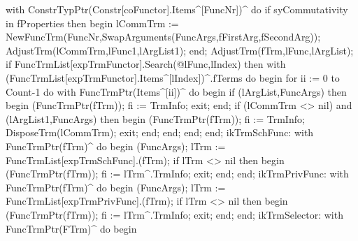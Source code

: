              with ConstrTypPtr(Constr[coFunctor].Items^[FuncNr])^ do
                 if syCommutativity in fProperties then
                 begin
                    lCommTrm := NewFuncTrm(FuncNr,SwapArguments(FuncArgs,fFirstArg,fSecondArg));
                    AdjustTrm(lCommTrm,lFunc1,lArgList1);
                 end;
              AdjustTrm(fTrm,lFunc,lArgList);
              if FuncTrmList[expTrmFunctor].Search(@lFunc,lIndex) then
                 with (FuncTrmList[expTrmFunctor].Items^[lIndex])^.fTerms do
                 begin
                    for ii := 0 to Count-1 do
                       with FuncTrmPtr(Items^[ii])^ do
                       begin
                          if (lArgList,FuncArgs) then
                          begin
                             (FuncTrmPtr(fTrm));
                             fi := TrmInfo;
                             exit;
                          end;
                          if (lCommTrm <> nil) and (lArgList1,FuncArgs) then
                          begin
                             (FuncTrmPtr(fTrm));
                             fi := TrmInfo;
                             DisposeTrm(lCommTrm);
                             exit;
                          end;
                       end;
                 end;
           end;
        ikTrmSchFunc:
           with FuncTrmPtr(fTrm)^ do
           begin
              (FuncArgs);
              lTrm := FuncTrmList[expTrmSchFunc].(fTrm);
              if lTrm <> nil then
              begin
                 (FuncTrmPtr(fTrm));
                 fi := lTrm^.TrmInfo;
                 exit;
              end;
           end;
        ikTrmPrivFunc:
           with FuncTrmPtr(fTrm)^ do
           begin
              (FuncArgs);
              lTrm := FuncTrmList[expTrmPrivFunc].(fTrm);
              if lTrm <> nil then
              begin
                 (FuncTrmPtr(fTrm));
                 fi := lTrm^.TrmInfo;
                 exit;
              end;
           end;
        ikTrmSelector:
           with FuncTrmPtr(FTrm)^ do
           begin
